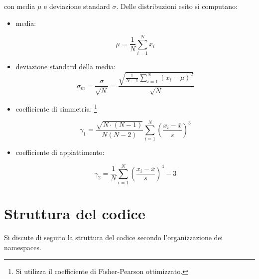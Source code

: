 \documentclass{article}
\begin{document}
con media \(\mu\) e deviazione standard \(\sigma\).
Delle distribuzioni esito si computano:
\begin{itemize}
    \item media:

\begin{equation}
    \mu = \frac{1}{N} \sum_{i=1}^N x_i
\end{equation}

\item deviazione standard della media:
\begin{equation}
    \sigma_m = \frac{\sigma}{\sqrt{N}} = \frac{\sqrt{\frac{1}{N-1} \sum_{i=1}^N (x_i - \mu)^2}}{\sqrt{N}}
\end{equation}



\item coefficiente di simmetria:
\footnote{Si utilizza il coefficiente di Fisher-Pearson ottimizzato.}

\begin{equation}
    \gamma_1 = \frac{\sqrt{N\cdot (N-1)}}{N(N-2)} \sum_{i=1}^N \left(\frac{x_i - \bar{x}}{s}\right)^3
\end{equation}

\item coefficiente di appiattimento:

\begin{equation}
   \gamma_2 =  \frac{1}{N}\sum_{i=1}^N \left(\frac{x_i - \bar{x}}{s}\right)^4 - 3
\end{equation}
\end{itemize}


\section{Struttura del codice}
Si discute di seguito la struttura del codice secondo l'organizzazione dei namespaces.
\end{document}
